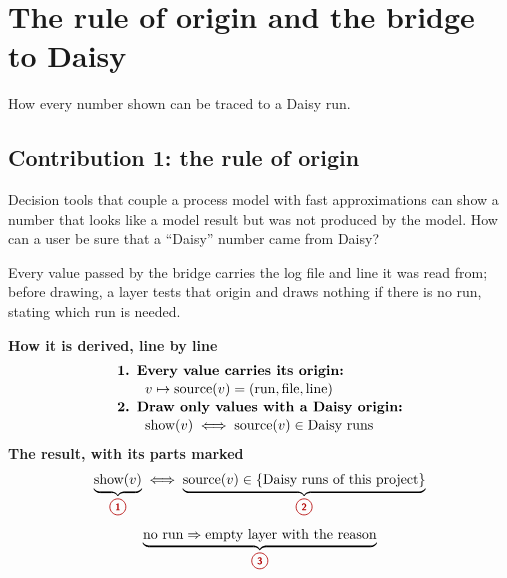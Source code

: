 \section{The rule of origin and the bridge to Daisy}
How every number shown can be traced to a Daisy run.

\subsection{Contribution 1: the rule of origin}\label{con:s3:1}
\begin{problem}
Decision tools that couple a process model with fast approximations can show a number that looks like a model result but was not produced by the model. How can a user be sure that a ``Daisy'' number came from Daisy?
\end{problem}
\begin{derivation}
Every value passed by the bridge carries the log file and line it was read from; before drawing, a layer tests that origin and draws nothing if there is no run, stating which run is needed.
\end{derivation}
\begin{keyresult}
\begin{pencil}
{\small\noindent\textbf{How it is derived, line by line}
\[\begin{array}{@{}l@{}}\textbf{1. Every value carries its origin:}\\[1pt]
\qquad v\mapsto\text{source}(v)=(\text{run},\text{file},\text{line})\\[1pt]
\textbf{2. Draw only values with a Daisy origin:}\\[1pt]
\qquad \text{show}(v)\iff\text{source}(v)\in\text{Daisy runs}
\end{array}\]}
\noindent\textbf{The result, with its parts marked}
\[\underbrace{\text{show}(v)}_{\circled{1}}\iff\underbrace{\text{source}(v)\in\{\text{Daisy runs of this project}\}}_{\circled{2}}\]
\[\underbrace{\text{no run}\Rightarrow\text{empty layer with the reason}}_{\circled{3}}\]
\end{pencil}
\end{keyresult}
\begin{pins}
\end{pins}


